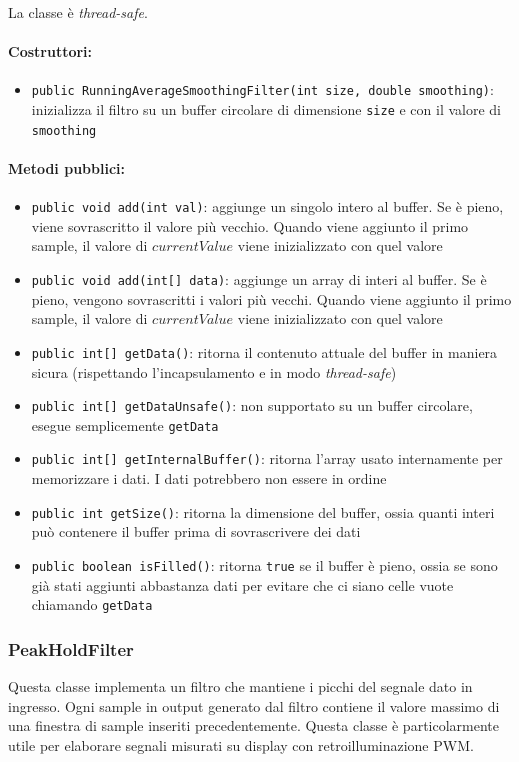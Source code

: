La classe è \textit{thread-safe}.

\paragraph{Costruttori:} \begin{itemize}
	\item \texttt{public RunningAverageSmoothingFilter(int size, double smoothing)}: inizializza il filtro su un buffer circolare di dimensione \texttt{size} e con il valore di \texttt{smoothing}
\end{itemize}

\paragraph{Metodi pubblici:} \begin{itemize}
	\item \texttt{public void add(int val)}: aggiunge un singolo intero al buffer. Se è pieno, viene sovrascritto il valore più vecchio. Quando viene aggiunto il primo sample, il valore di $currentValue$ viene inizializzato con quel valore
	\item \texttt{public void add(int[] data)}: aggiunge un array di interi al buffer. Se è pieno, vengono sovrascritti i valori più vecchi. Quando viene aggiunto il primo sample, il valore di $currentValue$ viene inizializzato con quel valore
	\item \texttt{public int[] getData()}: ritorna il contenuto attuale del buffer in maniera sicura (rispettando l'incapsulamento e in modo \textit{thread-safe})
	\item \texttt{public int[] getDataUnsafe()}: non supportato su un buffer circolare, esegue semplicemente \texttt{getData}
	\item \texttt{public int[] getInternalBuffer()}: ritorna l'array usato internamente per memorizzare i dati. I dati potrebbero non essere in ordine
	\item \texttt{public int getSize()}: ritorna la dimensione del buffer, ossia quanti interi può contenere il buffer prima di sovrascrivere dei dati
	\item \texttt{public boolean isFilled()}: ritorna \texttt{true} se il buffer è pieno, ossia se sono già stati aggiunti abbastanza dati per evitare che ci siano celle vuote chiamando \texttt{getData}
\end{itemize}

\subsubsection{PeakHoldFilter}
Questa classe implementa un filtro che mantiene i picchi del segnale dato in ingresso. Ogni sample in output generato dal filtro contiene il valore massimo di una finestra di sample inseriti precedentemente. Questa classe è particolarmente utile per elaborare segnali misurati su display con retroilluminazione PWM.

